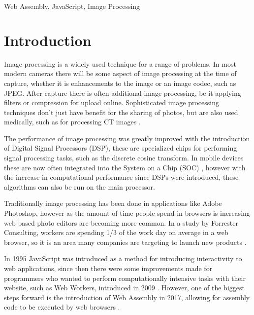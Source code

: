\documentclass[12pt,a4paper]{article}
\begin{document}
\begin{keywords}
    Web Assembly, JavaScript, Image Processing
\end{keywords}


\section{Introduction}

Image processing is a widely used technique for a range of problems. In most modern cameras there will be some aspect of image processing at the time of capture, whether it is enhancements to the image or an image codec, such as JPEG. After capture there is often additional image processing, be it applying filters or compression for upload online. Sophisticated image processing techniques don't just have benefit for the sharing of photos, but are also used medically, such as for processing CT images \cite{zhang2017applications}.

The performance of image processing was greatly improved with the introduction of Digital Signal Processors (DSP), these are specialized chips for performing signal processing tasks, such as the discrete cosine transform. In mobile devices these are now often integrated into the System on a Chip (SOC) \cite{angoletta2008digital}, however with the increase in computational performance since DSPs were introduced, these algorithms can also be run on the main processor.

Traditionally image processing has been done in applications like Adobe Photoshop, however as the amount of time people spend in browsers is increasing web based photo editors are becoming more common. In a study by Forrester Consulting, workers are spending 1/3 of the work day on average in a web browser, so it is an area many companies are targeting to launch new products \cite{cloud_worker}.


In 1995 JavaScript was introduced as a method for introducing interactivity to web applications, since then there were some improvements made for programmers who wanted to perform computationally intensive tasks with their website, such as Web Workers, introduced in 2009 \cite{Hickson}. However, one of the biggest steps forward is the introduction of Web Assembly in 2017, allowing for assembly code to be executed by web browsers \cite{haas2017bringing}.
\end{document}

